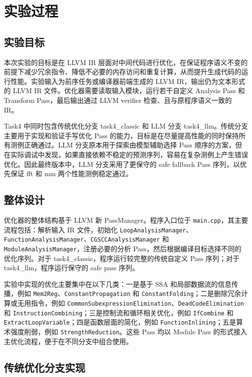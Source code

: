 \section{实验过程}

\subsection{实验目标}

本次实验的目标是在 LLVM IR 层面对中间代码进行优化，在保证程序语义不变的前提下减少冗余指令、降低不必要的内存访问和重复计算，从而提升生成代码的运行性能。实验输入为前序任务或编译器前端生成的 LLVM IR，输出仍为文本形式的 LLVM IR 文件。优化器需要读取输入模块，运行若干自定义 Analysis Pass 和 Transform Pass，最后输出通过 LLVM verifier 检查、且与原程序语义一致的 IR。

Task4 中同时包含传统优化分支 task4\_classic 和 LLM 分支 task4\_llm。传统分支主要用于实现和验证手写优化 Pass 的能力，目标是在尽量提高性能的同时保持所有测例正确通过。LLM 分支原本用于探索由模型辅助选择 Pass 顺序的方案，但在实际调试中发现，如果直接依赖不稳定的预测序列，容易在复杂测例上产生错误优化。因此最终版本中，LLM 分支采用了更保守的 safe fallback Pass 序列，以优先保证 fft 和 mm 两个性能测例稳定通过。

\subsection{整体设计}

优化器的整体结构基于 LLVM 新 PassManager。程序入口位于 \texttt{main.cpp}，其主要流程包括：解析输入 IR 文件，初始化 \texttt{LoopAnalysisManager}、\texttt{FunctionAnalysisManager}、\texttt{CGSCCAnalysisManager} 和 \texttt{ModuleAnalysisManager}，注册必要的分析 Pass，然后根据编译目标选择不同的优化序列。对于 task4\_classic，程序运行较完整的传统自定义 Pass 序列；对于 task4\_llm，程序运行保守的 safe pass 序列。

实验中实现的优化主要集中在以下几类：一是基于 SSA 和局部数据流的信息传播，例如 \texttt{Mem2Reg}、\texttt{ConstantPropagation} 和 \texttt{ConstantFolding}；二是删除冗余计算或无用指令，例如 \texttt{CommonSubexpressionElimination}、\texttt{DeadCodeElimination} 和 \texttt{InstructionCombining}；三是控制流和循环相关优化，例如 \texttt{IfCombine} 和 \texttt{ExtractLoopVariable}；四是函数层面的简化，例如 \texttt{FunctionInlining}；五是算术强度削弱，例如 \texttt{StrengthReduction}。这些 Pass 均以 Module Pass 的形式接入主优化流程，便于在不同分支中组合使用。

\subsection{传统优化分支实现}

